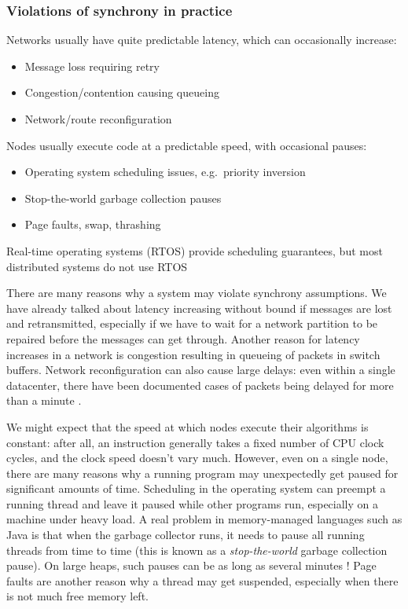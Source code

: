 \begin{frame}
    \label{s:timing-violations}
    \frametitle{Violations of synchrony in practice}
    Networks usually have quite predictable latency, which can occasionally increase:
    \begin{itemize}
        \item Message loss requiring retry
        \item Congestion/contention causing queueing
        \item Network/route reconfiguration\\[1em]
    \end{itemize}\pause
    Nodes usually execute code at a predictable speed, with occasional pauses:
    \begin{itemize}
        \item Operating system scheduling issues, e.g.\ priority inversion
        \item Stop-the-world garbage collection pauses
        \item Page faults, swap, thrashing
    \end{itemize}
    Real-time operating systems (RTOS) provide scheduling guarantees, but most distributed systems do not use RTOS
\end{frame}
\label{l:timing-violations}

There are many reasons why a system may violate synchrony assumptions.
We have already talked about latency increasing without bound if messages are lost and retransmitted, especially if we have to wait for a network partition to be repaired before the messages can get through.
Another reason for latency increases in a network is congestion resulting in queueing of packets in switch buffers.
Network reconfiguration can also cause large delays: even within a single datacenter, there have been documented cases of packets being delayed for more than a minute \citep{Imbriaco:2012tx}.

We might expect that the speed at which nodes execute their algorithms is constant: after all, an instruction generally takes a fixed number of CPU clock cycles, and the clock speed doesn't vary much.
However, even on a single node, there are many reasons why a running program may unexpectedly get paused for significant amounts of time.
Scheduling in the operating system can preempt a running thread and leave it paused while other programs run, especially on a machine under heavy load.
A real problem in memory-managed languages such as Java is that when the garbage collector runs, it needs to pause all running threads from time to time (this is known as a \emph{stop-the-world} garbage collection pause).
On large heaps, such pauses can be as long as several minutes \citep{Thompson:2013}!
Page faults are another reason why a thread may get suspended, especially when there is not much free memory left.

